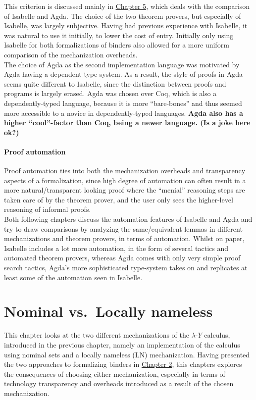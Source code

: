 \documentclass[a4paper, 12pt, twoside]{style/ociamthesis}
\theoremstyle{plain}
\theoremstyle{definition}
\theoremstyle{remark}
\newcommand{\lamy}{\lambda\text{-}Y}
\begin{document}
This criterion is discussed mainly in
\protect\hyperlink{comp-agda}{Chapter 5}, which deals with the
comparison of Isabelle and Agda. The choice of the two theorem provers,
but especially of Isabelle, was largely subjective. Having had previous
experience with Isabelle, it was natural to use it initially, to lower
the cost of entry. Initially only using Isabelle for both formalizations
of binders also allowed for a more uniform comparison of the
mechanization overheads.\\
The choice of Agda as the second implementation language was motivated
by Agda having a dependent-type system. As a result, the style of proofs
in Agda seems quite different to Isabelle, since the distinction between
proofs and programs is largely erased. Agda was chosen over Coq, which
is also a dependently-typed language, because it is more ``bare-bones''
and thus seemed more accessible to a novice in dependently-typed
languages. \textbf{Agda also has a higher ``cool''-factor than Coq,
being a newer language. (Is a joke here ok?)}

\subsubsection{Proof automation}\label{proof-automation}

Proof automation ties into both the mechanization overheads and
transparency aspects of a formalization, since high degree of automation
can often result in a more natural/transparent looking proof where the
``menial'' reasoning steps are taken care of by the theorem prover, and
the user only sees the higher-level reasoning of informal proofs.\\
Both following chapters discuss the automation features of Isabelle and
Agda and try to draw comparisons by analyzing the same/equivalent lemmas
in different mechanizations and theorem provers, in terms of automation.
Whilst on paper, Isabelle includes a lot more automation, in the form of
several tactics and automated theorem provers, whereas Agda comes with
only very simple proof search tactics, Agda's more sophisticated
type-system takes on and replicates at least some of the automation seen
in Isabelle.

\hypertarget{comp-isa}{\chapter{Nominal vs.~Locally
nameless}\label{comp-isa}}

This chapter looks at the two different mechanizations of the \(\lamy\)
calculus, introduced in the previous chapter, namely an implementation
of the calculus using nominal sets and a locally nameless (LN)
mechanization. Having presented the two approaches to formalizing
binders in \protect\hyperlink{binders}{Chapter 2}, this chapters
explores the consequences of choosing either mechanization, especially
in terms of technology transparency and overheads introduced as a result
of the chosen mechanization.
\end{document}
